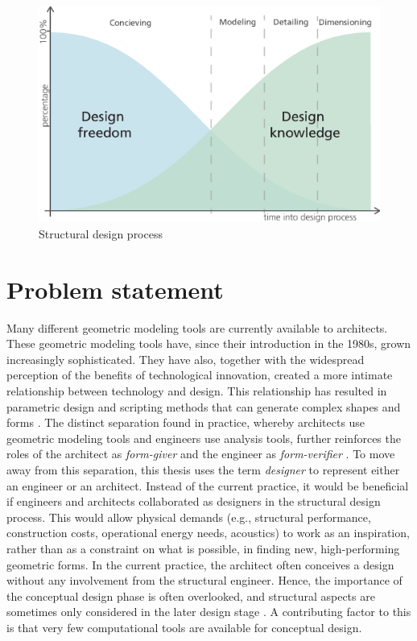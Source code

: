 \begin{figure}
  \includegraphics[width=350pt]{graphics/freedom-vs-knowledge.eps}
  \caption{Structural design process \cite{Mueller2014}}
  \label{fig:freedom-vs-knowledge}
\end{figure}

\section{Problem statement}
Many different geometric modeling tools are currently available to architects. These geometric modeling tools have, since their introduction in the 1980s, grown increasingly sophisticated. They have also, together with the widespread perception of the benefits of technological innovation, created a more intimate relationship between technology and design. This relationship has resulted in parametric design and scripting methods that can generate complex shapes and forms \cite{sakamoto2008control}. The distinct separation found in practice, whereby architects use geometric modeling tools and engineers use analysis tools, further reinforces the roles of the architect as \textit{form-giver} and the engineer as \textit{form-verifier} \cite{mueller2013integrated}. To move away from this separation, this thesis uses the term \textit{designer} to represent either an engineer or an architect. Instead of the current practice, it would be beneficial if engineers and architects collaborated as designers in the structural design process. This would allow physical demands (e.g., structural performance, construction costs, operational energy needs, acoustics) to work as an inspiration, rather than as a constraint on what is possible, in finding new, high-performing geometric forms. 
In the current practice, the architect often conceives a design without any involvement from the structural engineer. Hence, the importance of the conceptual design phase is often overlooked, and structural aspects are sometimes only considered in the later design stage \cite{schlaich2006challenges}. A contributing factor to this is that very few computational tools are available for conceptual design. 

